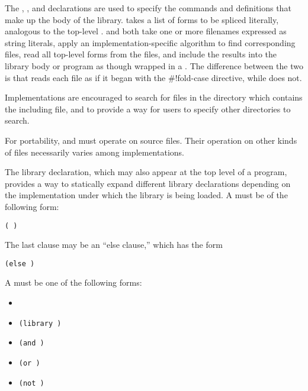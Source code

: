 The , , and  declarations are
used to specify the commands and definitions that make up the body of
the library.   takes a list of forms to be spliced
literally, analogous to the top-level .  
 and
 both take one or more filenames expressed as string literals,
apply an implementation-specific algorithm to find corresponding files,
read all top-level
forms from the files, and include the results into the library body or program as
though wrapped in a .
The difference between the two is that  reads each file
as if it began with the {\cf{}\#!fold-case} directive, while 
does not.

\begin{note}
Implementations are encouraged to search for files in the directory
which contains the including file, and to provide a way for users to
specify other directories to search.
\end{note}

\begin{note}
For portability,  and  must operate on source files.
Their operation on other kinds of files necessarily varies among
implementations.
\end{note}

The  library declaration,
which may also appear at the top level of a program,
provides a way to statically
expand different library declarations depending on the 
implementation under which the library is being loaded.  A
 must be of the following form:

{\tt(  \dotsfoo)}

The last clause may be an ``else clause,'' which has the form

{\tt(else  \dotsfoo)}

A  must be one of the following forms:

\begin{itemize}
\item {\tt{}}
\item {\tt(library )}
\item {\tt(and  \dotsfoo)}
\item {\tt(or  \dotsfoo)}
\item {\tt(not )}
\end{itemize}

